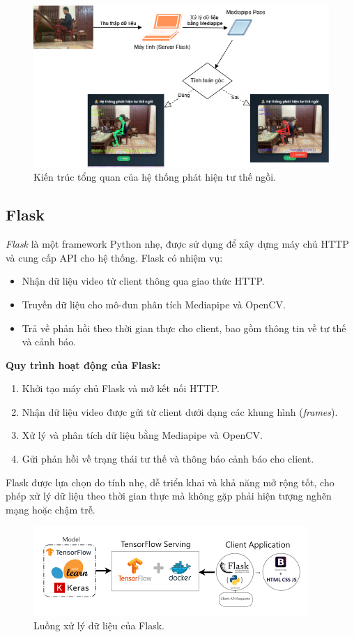 \documentclass[journal,onecolumn]{IEEEtran}
\begin{document}
\begin{figure}[H]
    \centering
    \includegraphics[width=0.7\linewidth]{images/system_architecture.png}
    \caption{Kiến trúc tổng quan của hệ thống phát hiện tư thế ngồi.}
    \label{fig:system_architecture}
\end{figure}

\subsection{\textbf{Flask}}
\textit{Flask} là một framework Python nhẹ, được sử dụng để xây dựng máy chủ HTTP và cung cấp API cho hệ thống. Flask có nhiệm vụ:
\begin{itemize}
    \item Nhận dữ liệu video từ client thông qua giao thức HTTP.
    \item Truyền dữ liệu cho mô-đun phân tích Mediapipe và OpenCV.
    \item Trả về phản hồi theo thời gian thực cho client, bao gồm thông tin về tư thế và cảnh báo.
\end{itemize}

\textbf{Quy trình hoạt động của Flask:}
\begin{enumerate}
    \item Khởi tạo máy chủ Flask và mở kết nối HTTP.
    \item Nhận dữ liệu video được gửi từ client dưới dạng các khung hình (\textit{frames}).
    \item Xử lý và phân tích dữ liệu bằng Mediapipe và OpenCV.
    \item Gửi phản hồi về trạng thái tư thế và thông báo cảnh báo cho client.
\end{enumerate}

Flask được lựa chọn do tính nhẹ, dễ triển khai và khả năng mở rộng tốt, cho phép xử lý dữ liệu theo thời gian thực mà không gặp phải hiện tượng nghẽn mạng hoặc chậm trễ.

\begin{figure}[H]
    \centering
    \includegraphics[width=0.7\linewidth]{images/flask_workflow.png}
    \caption{Luồng xử lý dữ liệu của Flask.}
    \label{fig:flask_workflow}
\end{figure}
\end{document}
